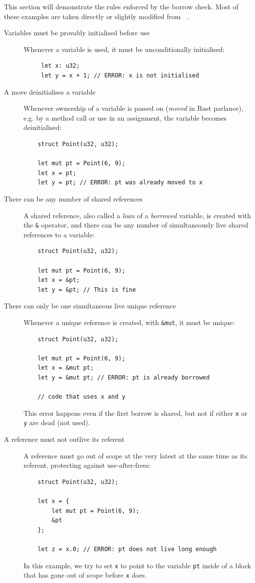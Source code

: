 \documentclass[11pt,a4paper,twoside,openany]{report}
\newcommand{\InRust}[1]{\texttt{#1}}
\begin{document}
This section will demonstrate the rules enforced by the borrow check. Most of
these examples are taken directly or slightly modified from
\citeauthor*{weiss_oxide:_2019}~\cite{weiss_oxide:_2019}.

\begin{description}  
\item[Variables must be provably initialised before use] Whenever a variable is
  used, it must be unconditionally initialised:
  \begin{verbatim}
     let x: u32;
     let y = x + 1; // ERROR: x is not initialised
  \end{verbatim}
\item[A move deinitialises a variable] Whenever ownership of a variable is
  passed on (\emph{moved} in Rust parlance), e.g. by a method call or use in an
  assignment, the variable becomes deinitialised:
  \begin{verbatim}
    struct Point(u32, u32);
    
    let mut pt = Point(6, 9);
    let x = pt;
    let y = pt; // ERROR: pt was already moved to x
  \end{verbatim}
\item[There can be any number of shared references] A shared reference, also
  called a \textit{loan} of a \textit{borrowed} variable, is created with the
  \InRust{&} operator, and there can be any number of simultaneously live shared
  references to a variable:
  \begin{verbatim}
    struct Point(u32, u32);
    
    let mut pt = Point(6, 9);
    let x = &pt;
    let y = &pt; // This is fine
  \end{verbatim}
\item[There can only be one simultaneous live unique reference] Whenever a
  unique reference is created, with \InRust{&mut}, it must be unique:
  \begin{verbatim}
    struct Point(u32, u32);
    
    let mut pt = Point(6, 9);
    let x = &mut pt;
    let y = &mut pt; // ERROR: pt is already borrowed
    
    // code that uses x and y
  \end{verbatim}

  This error happens even if the first borrow is shared, but not if
  either \InRust{x} or \InRust{y} are dead (not used).
  
\item[A reference must not outlive its referent] A reference must go out of
  scope at the very latest at the same time as its referent, protecting against
  use-after-frees:
  \begin{verbatim}
    struct Point(u32, u32);
    
    let x = {
        let mut pt = Point(6, 9);
        &pt
    };
    
    let z = x.0; // ERROR: pt does not live long enough
  \end{verbatim}

  In this example, we try to set \InRust{x} to point to the variable \InRust{pt}
  inside of a block that has gone out of scope before \InRust{x} does.
\end{description}
\end{document}
